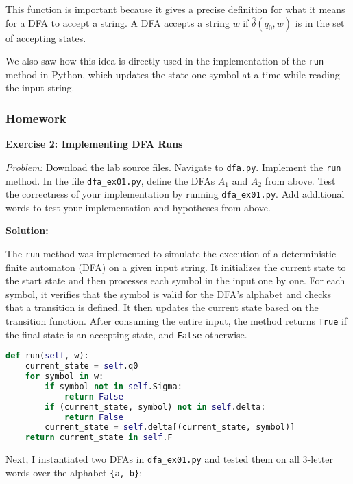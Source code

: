 \documentclass{article}
\theoremstyle{theorem}
\theoremstyle{definition}
\theoremstyle{remark}
\begin{document}
This function is important because it gives a precise definition for what it means for a DFA to accept a string. A DFA accepts a string $w$ if $\hat{\delta}(q_0, w)$ is in the set of accepting states.

We also saw how this idea is directly used in the implementation of the \texttt{run} method in Python, which updates the state one symbol at a time while reading the input string.


\subsubsection{Homework}

\textbf{Exercise 2: Implementing DFA Runs}

\textit{Problem:}  
Download the lab source files. Navigate to \texttt{dfa.py}. Implement the \texttt{run} method.  
In the file \texttt{dfa\_ex01.py}, define the DFAs $A_1$ and $A_2$ from above.  
Test the correctness of your implementation by running \texttt{dfa\_ex01.py}.  
Add additional words to test your implementation and hypotheses from above.

\vspace{0.5em}

\textbf{Solution:}

The \texttt{run} method was implemented to simulate the execution of a deterministic finite automaton (DFA) on a given input string. It initializes the current state to the start state and then processes each symbol in the input one by one. For each symbol, it verifies that the symbol is valid for the DFA's alphabet and checks that a transition is defined. It then updates the current state based on the transition function. After consuming the entire input, the method returns \texttt{True} if the final state is an accepting state, and \texttt{False} otherwise.

\begin{lstlisting}[language=Python]
def run(self, w):
    current_state = self.q0
    for symbol in w:
        if symbol not in self.Sigma:
            return False
        if (current_state, symbol) not in self.delta:
            return False
        current_state = self.delta[(current_state, symbol)]
    return current_state in self.F
\end{lstlisting}

Next, I instantiated two DFAs in \texttt{dfa\_ex01.py} and tested them on all 3-letter words over the alphabet \texttt{\{a, b\}}:
\end{document}
